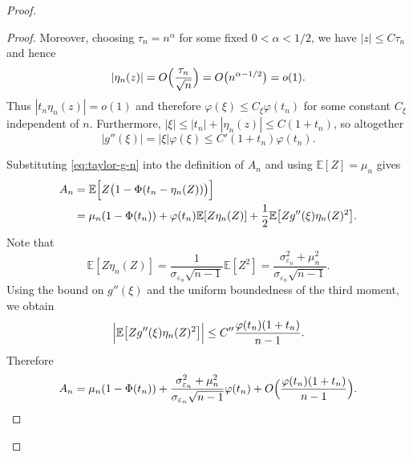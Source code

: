 \documentclass{article}
\theoremstyle{plain}
\theoremstyle{definition}
\begin{document}
\begin{proof}
\begin{proof}
Moreover, choosing $\tau_n = n^\alpha$ for some fixed
$0<\alpha<1/2$, we have $|z|\le C \tau_n$ and hence
\[
  |\eta_n(z)|
  = O\Bigl(\frac{\tau_n}{\sqrt{n}}\Bigr)
  = O\bigl(n^{\alpha-1/2}\bigr)
  = o(1).
\]
Thus $|t_n\eta_n(z)| = o(1)$ and therefore
$\varphi(\xi)\le C_\xi\varphi(t_n)$ for some constant $C_\xi$
independent of $n$. Furthermore,
$|\xi|\le |t_n|+|\eta_n(z)|\le C(1+t_n)$, so altogether
\[
  |g''(\xi)| = |\xi|\varphi(\xi)
  \le C'(1+t_n)\varphi(t_n).
\]

Substituting \eqref{eq:taylor-g-n} into the definition of $A_n$ and
using $\mathbb E[Z]=\mu_n$ gives
\begin{align*}
  A_n
  &= \mathbb E\Bigl[
       Z\bigl(1-\Phi(t_n-\eta_n(Z))\bigr)
     \Bigr]\\
  &= \mu_n(1-\Phi(t_n))
     +\varphi(t_n)\mathbb E[Z\eta_n(Z)]
     +\frac12\mathbb E\bigl[Z g''(\xi)\eta_n(Z)^2\bigr].
\end{align*}
Note that
\[
  \mathbb E[Z\eta_n(Z)]
  = \frac{1}{\sigma_{\varepsilon_n}\sqrt{n-1}}\mathbb E[Z^2]
  = \frac{\sigma_{\varepsilon_n}^2+\mu_n^2}
         {\sigma_{\varepsilon_n}\sqrt{n-1}}.
\]
Using the bound on $g''(\xi)$ and the uniform boundedness of the third
moment, we obtain
\[
  \Bigl|
    \mathbb E\bigl[Z g''(\xi)\eta_n(Z)^2\bigr]
  \Bigr|
  \le C''\frac{\varphi(t_n)(1+t_n)}{n-1}.
\]
Therefore
\begin{equation}
  \label{eq:A-n-expansion}
  A_n
  = \mu_n(1-\Phi(t_n))
    +\frac{\sigma_{\varepsilon_n}^2+\mu_n^2}
          {\sigma_{\varepsilon_n}\sqrt{n-1}}\varphi(t_n)
    +O\Bigl(\frac{\varphi(t_n)(1+t_n)}{n-1}\Bigr).
\end{equation}


\end{proof}
\end{proof}
\end{document}
